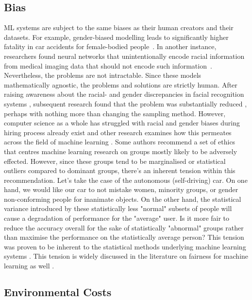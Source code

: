 \subsection{Bias}
ML systems are subject to the same biases as their human creators and their datasets. 
For example, gender-biased modelling leads to significantly higher fatality in car accidents for female-bodied people~\cite{evans2001gender}. 
In another instance, researchers found neural networks that unintentionally encode racial information from medical imaging data that should not encode such information~\cite{gichoya2022ai}. 
Nevertheless, the problems are not intractable. Since these models mathematically agnostic, the problems and solutions are strictly human. 
After raising awareness about the racial- and gender discrepancies in facial recognition systems \cite{buolamwini2018gender}, subsequent research found that the problem was substantially reduced \cite{raji2019actionable}, perhaps with nothing more than changing the sampling method. However, computer science as a whole has struggled with racial and gender biases during hiring process already exist \cite{rattan2019identical,yarger2020algorithmic} and other research examines how this permeates across the field of machine learning \cite{birhane2021algorithmic}. Some authors \cite{birhane2021algorithmic} recommend a set of ethics that centres machine learning research on groups mostly likely to be adversely effected. However, since these groups tend to be marginalised or statistical outliers compared to dominant groups, there's an inherent tension within this recommendation. Let's take the case of the autonomous (self-driving) car. On one hand, we would like our car to not mistake women, minority groups, or gender non-conforming people for inanimate objects. On the other hand, the statistical variance introduced by these statistically less "normal" subsets of people will cause a degradation of performance for the "average" user. Is it more fair to reduce the accuracy overall for the sake of statistically "abnormal" groups rather than maximise the performance on the statistically average person? This tension was proven to be inherent to the statistical methods underlying machine learning systems \cite{carlini_towards_2017}. This tension is widely discussed in the literature on fairness for machine learning as well \cite{feuerriegel2020fair,van2021fairness,corbett2018measure}.
\subsection{Environmental Costs}
\label{subsec:environment}

